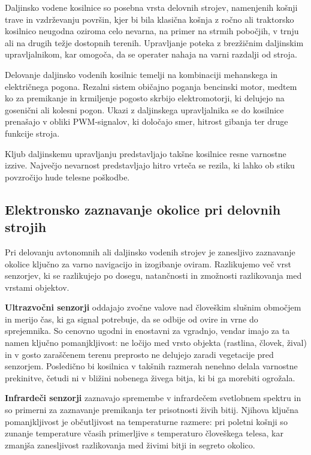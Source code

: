 \documentclass[12pt]{article}
\begin{document}
Daljinsko vodene kosilnice so posebna vrsta delovnih strojev,
namenjenih košnji trave in vzdrževanju površin, kjer bi bila klasična
košnja z ročno ali traktorsko kosilnico neugodna oziroma celo nevarna,
na primer na strmih pobočjih, v trnju ali na drugih težje dostopnih
terenih. Upravljanje poteka z brezžičnim daljinskim upravljalnikom,
kar omogoča, da se operater nahaja na varni razdalji od stroja.

Delovanje daljinsko vodenih kosilnic temelji na kombinaciji mehanskega
in električnega pogona. Rezalni sistem običajno poganja bencinski
motor, medtem ko za premikanje in krmiljenje pogosto skrbijo
elektromotorji, ki delujejo na gosenični ali kolesni pogon. Ukazi z
daljinskega upravljalnika se do kosilnice prenašajo v obliki
PWM-signalov, ki določajo smer, hitrost gibanja ter druge funkcije
stroja.

Kljub daljinskemu upravljanju predstavljajo takšne kosilnice resne
varnostne izzive. Največjo nevarnost predstavljajo hitro vrteča se
rezila, ki lahko ob stiku povzročijo hude telesne poškodbe.

\subsection{Elektronsko zaznavanje okolice pri delovnih strojih}

Pri delovanju avtonomnih ali daljinsko vodenih strojev je zanesljivo
zaznavanje okolice ključno za varno navigacijo in izogibanje oviram.
Razlikujemo več vrst senzorjev, ki se razlikujejo po dosegu,
natančnosti in zmožnosti razlikovanja med vrstami objektov.

\textbf{Ultrazvočni senzorji} oddajajo zvočne valove nad človeškim
slušnim območjem in merijo čas, ki ga signal potrebuje, da se odbije
od ovire in vrne do sprejemnika. So cenovno ugodni in enostavni za
vgradnjo, vendar imajo za ta namen ključno pomanjkljivost: ne ločijo
med vrsto objekta (rastlina, človek, žival) in v gosto zaraščenem
terenu preprosto  ne delujejo zaradi vegetacije pred senzorjem. Posledično bi kosilnica v takšnih
razmerah nenehno delala varnostne prekinitve, četudi ni v bližini
nobenega živega bitja, ki bi ga morebiti ogrožala.

\textbf{Infrardeči senzorji} zaznavajo spremembe v infrardečem
svetlobnem spektru in so primerni za zaznavanje premikanja ter
prisotnosti živih bitij. Njihova ključna pomanjkljivost je občutljivost
na temperaturne razmere: pri poletni košnji so zunanje temperature
včasih primerljive s temperaturo človeškega telesa, kar zmanjša
zanesljivost razlikovanja med živimi bitji in segreto okolico.
\end{document}
